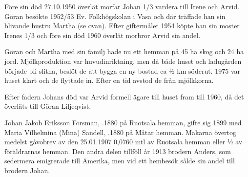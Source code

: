 Före sin död 27.10.1950 överlät morfar Johan 1/3 vardera till Irene och Arvid. Göran besökte 1952/53 Ev. Folkhögskolan i Vasa och där träffade han sin blivande hustru Martha (se ovan). Efter giftermålet 1954 köpte han sin moster Irenes 1/3 och före sin död 1960 överlät morbror Arvid sin andel.

Göran och Martha med sin familj hade nu ett hemman på 45 ha skog och 24 ha jord. Mjölkproduktion var huvudinriktning, men då både huset och ladugården började bli slitna, beslöt de att bygga en ny bostad ca ½ km söderut. 1975 var huset klart och de flyttade in. Efter en tid avstod de från mjölkkorna.


Efter fadern Johans död var Arvid formell ägare till huset fram till 1960, då det överläts till Göran Liljeqvist.\jhvspace{}



Johan Jakob Eriksson Forsman, .1880 på Ruotsala hemman, gifte sig 1899 med Maria Vilhelmina (Mina) Sandell, .1880 på Måtar hemman. Makarna övertog medelst gåvobrev av den 25.01.1907  0,0760 mtl av Ruotsala hemman eller ½ av föräldrarnas hemman. Den andra delen tillföll år 1913 brodern Anders, som sedermera emigrerade till Amerika, men vid ett hembesök sålde sin andel till brodern Johan.

